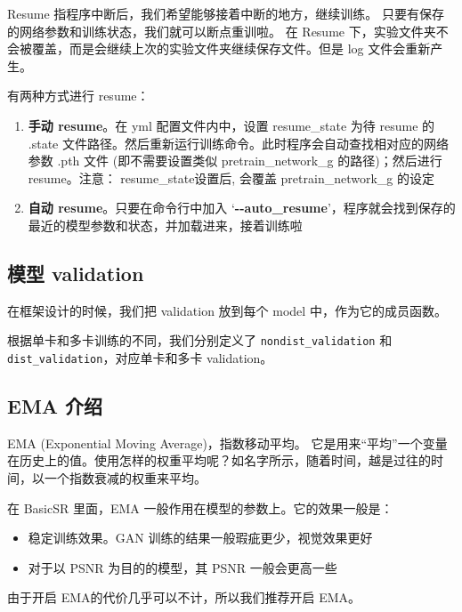 \documentclass[../main.tex]{subfiles}
\begin{document}
Resume 指程序中断后，我们希望能够接着中断的地方，继续训练。
只要有保存的网络参数和训练状态，我们就可以断点重训啦。
在 Resume 下，实验文件夹不会被覆盖，而是会继续上次的实验文件夹继续保存文件。但是 log 文件会重新产生。

有两种方式进行 resume：

\begin{enumerate}
    \item \textbf{手动 resume}。在 yml 配置文件内中，设置 resume\_state 为待 resume 的 .state 文件路径。然后重新运行训练命令。此时程序会自动查找相对应的网络参数 .pth 文件 (即不需要设置类似 pretrain\_network\_g 的路径)；然后进行 resume。注意： resume\_state设置后, 会覆盖 pretrain\_network\_g 的设定
    \item \textbf{自动 resume}。只要在命令行中加入 ‘\textbf{-{}-auto\_resume}’，程序就会找到保存的最近的模型参数和状态，并加载进来，接着训练啦
\end{enumerate}

\subsection{模型 validation}\label{code_structure:validation}

在框架设计的时候，我们把 validation 放到每个 model 中，作为它的成员函数。

根据单卡和多卡训练的不同，我们分别定义了 \texttt{nondist\_validation} 和 \texttt{dist\_validation}，对应单卡和多卡 validation。

\subsection{EMA 介绍}\label{code_structure:ema}

EMA (Exponential Moving Average)，指数移动平均。
它是用来“平均”一个变量在历史上的值。使用怎样的权重平均呢？如名字所示，随着时间，越是过往的时间，以一个指数衰减的权重来平均。

在 BasicSR 里面，EMA 一般作用在模型的参数上。它的效果一般是：

\begin{itemize}
    \item 稳定训练效果。GAN 训练的结果一般瑕疵更少，视觉效果更好
    \item 对于以 PSNR 为目的的模型，其 PSNR 一般会更高一些
\end{itemize}

由于开启 EMA的代价几乎可以不计，所以我们推荐开启 EMA。
\end{document}
